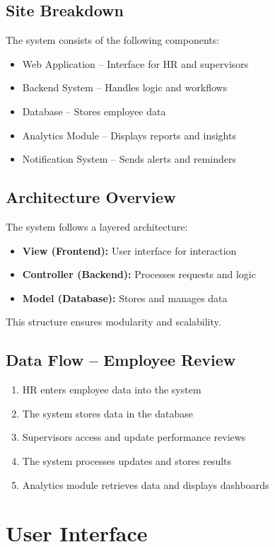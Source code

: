 \documentclass[12pt]{article}
\begin{document}
\subsection{Site Breakdown}
The system consists of the following components:
\begin{itemize}
\item Web Application – Interface for HR and supervisors
\item Backend System – Handles logic and workflows
\item Database – Stores employee data
\item Analytics Module – Displays reports and insights
\item Notification System – Sends alerts and reminders
\end{itemize}

\subsection{Architecture Overview}
The system follows a layered architecture:
\begin{itemize}
\item \textbf{View (Frontend):} User interface for interaction
\item \textbf{Controller (Backend):} Processes requests and logic
\item \textbf{Model (Database):} Stores and manages data
\end{itemize}

This structure ensures modularity and scalability.

\subsection{Data Flow – Employee Review}
\begin{enumerate}
\item HR enters employee data into the system
\item The system stores data in the database
\item Supervisors access and update performance reviews
\item The system processes updates and stores results
\item Analytics module retrieves data and displays dashboards
\end{enumerate}

\section{User Interface}
\end{document}
